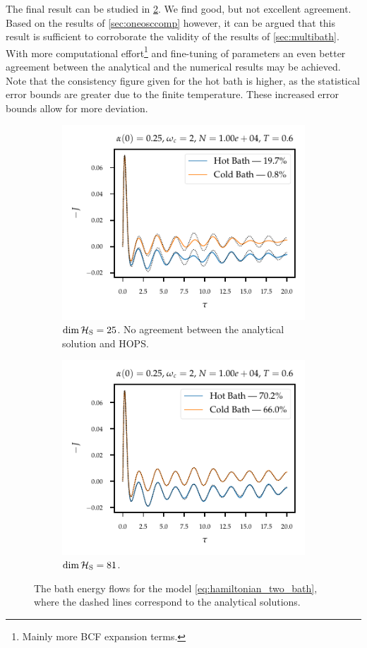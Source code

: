 The final result can be studied in \cref{fig:sufficient_levels}. We
find good, but not excellent agreement. Based on the results of
\cref{sec:oneosccomp} however, it can be argued that this result is
sufficient to corroborate the validity of the results of
\cref{sec:multibath}. With more computational effort\footnote{Mainly
  more BCF expansion terms.} and fine-tuning of parameters an even
better agreement between the analytical and the numerical results may
be achieved. Note that the consistency figure given for the hot bath
is higher, as the statistical error bounds are greater due to the
finite temperature. These increased error bounds allow for more
deviation.
\begin{figure}[htp]
  \centering
  \begin{subfigure}[t]{.49\linewidth}
    \includegraphics{figs/analytic_comp/comparison_two_5bcf_5ho.pdf}
    \caption{\label{fig:insufficient_levels}\(\operatorname{dim}\mathcal{H}_{\mathrm{S}}=25\).  No
      agreement between the analytical solution and HOPS.}
  \end{subfigure}
  \begin{subfigure}[t]{.49\linewidth}
    \includegraphics{figs/analytic_comp/comparison_two_ho.pdf}
    \caption{\label{fig:sufficient_levels}\(\operatorname{dim}\mathcal{H}_{\mathrm{S}}=81\).}
  \end{subfigure}
  \caption{\label{fig:comp_two_bath} The bath energy flows for
    the model \cref{eq:hamiltonian_two_bath}, where the dashed lines
    correspond to the analytical solutions.}
\end{figure}

